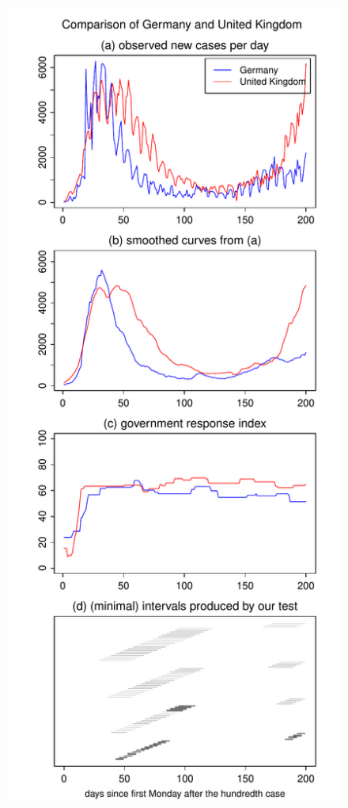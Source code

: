 \documentclass[a4paper,12pt]{article}
\numberwithin{equation}{section}
\begin{document}
{\begin{figure}[h!]
\begin{minipage}[t]{0.49\textwidth}
\includegraphics[width=\textwidth]{plots/DEU_vs_GBR_four_countries}

\end{minipage}
\end{figure}}
\end{document}
